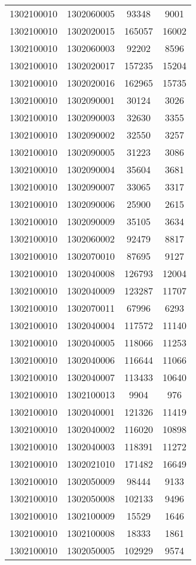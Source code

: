 \begin{longtable}{llcc}
1302100010 & 1302060005 & 93348 & 9001\\
1302100010 & 1302020015 & 165057 & 16002\\
1302100010 & 1302060003 & 92202 & 8596\\
1302100010 & 1302020017 & 157235 & 15204\\
1302100010 & 1302020016 & 162965 & 15735\\
1302100010 & 1302090001 & 30124 & 3026\\
1302100010 & 1302090003 & 32630 & 3355\\
1302100010 & 1302090002 & 32550 & 3257\\
1302100010 & 1302090005 & 31223 & 3086\\
1302100010 & 1302090004 & 35604 & 3681\\
1302100010 & 1302090007 & 33065 & 3317\\
1302100010 & 1302090006 & 25900 & 2615\\
1302100010 & 1302090009 & 35105 & 3634\\
1302100010 & 1302060002 & 92479 & 8817\\
1302100010 & 1302070010 & 87695 & 9127\\
1302100010 & 1302040008 & 126793 & 12004\\
1302100010 & 1302040009 & 123287 & 11707\\
1302100010 & 1302070011 & 67996 & 6293\\
1302100010 & 1302040004 & 117572 & 11140\\
1302100010 & 1302040005 & 118066 & 11253\\
1302100010 & 1302040006 & 116644 & 11066\\
1302100010 & 1302040007 & 113433 & 10640\\
1302100010 & 1302100013 & 9904 & 976\\
1302100010 & 1302040001 & 121326 & 11419\\
1302100010 & 1302040002 & 116020 & 10898\\
1302100010 & 1302040003 & 118391 & 11272\\
1302100010 & 1302021010 & 171482 & 16649\\
1302100010 & 1302050009 & 98444 & 9133\\
1302100010 & 1302050008 & 102133 & 9496\\
1302100010 & 1302100009 & 15529 & 1646\\
1302100010 & 1302100008 & 18333 & 1861\\
1302100010 & 1302050005 & 102929 & 9574\\

\end{longtable}
